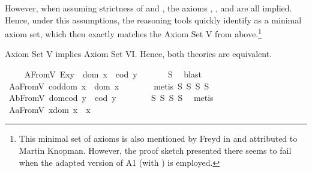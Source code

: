 \begin{isabellebody}
\begin{isamarkuptext}
   However, when assuming strictness of  and , the axioms , 
   ,  and  are all implied. Hence, under this 
   assumptions, the reasoning tools quickly identify  as a minimal axiom 
   set, which then exactly matches the Axiom Set V from above.\footnote{This minimal set of axioms 
   is also mentioned by Freyd in \cite{Freyd16} and attributed to Martin Knopman. However, the proof
   sketch presented there seems to fail when the adapted version of A1 (with \isa{{\isasymsimeq}}) is employed.}%
\end{isamarkuptext}\isamarkuptrue%
%
\begin{isamarkuptext}%
Axiom Set V implies Axiom Set VI. Hence, both theories are equivalent.%
\end{isamarkuptext}\isamarkuptrue%
\isanewline
\ \ \isamarkupfalse%
\ \ A{}FromV{\isacharcolon}\ {\isachardoublequoteopen}E{\isacharparenleft}x{\isasymcdot}y{\isacharparenright}\ \isactrlbold {\isasymleftrightarrow}\ dom\ x\ {\isasymsimeq}\ cod\ y{\isachardoublequoteclose}\ \isanewline
%
\isadelimproof
\ \ \ \ %
\endisadelimproof
%
\isatagproof
{}\isamarkupfalse%
\ S{}\ \isamarkupfalse%
\ blast%
\endisatagproof
{\isafoldproof}%
%
\isadelimproof
\isanewline
%
\endisadelimproof
\ \ \isamarkupfalse%
\ A{}aFromV{\isacharcolon}\ {\isachardoublequoteopen}cod{\isacharparenleft}dom\ x{\isacharparenright}\ {\isasymcong}\ dom\ x{\isachardoublequoteclose}\ \ \isanewline
%
\isadelimproof
\ \ \ \ %
\endisadelimproof
%
\isatagproof
{}\isamarkupfalse%
\ {\isacharparenleft}metis\ S{}\ S{}\ S{}\ S{}{\isacharparenright}%
\endisatagproof
{\isafoldproof}%
%
\isadelimproof
\isanewline
%
\endisadelimproof
\ \ \isamarkupfalse%
\ A{}bFromV{\isacharcolon}\ {\isachardoublequoteopen}dom{\isacharparenleft}cod\ y{\isacharparenright}\ {\isasymcong}\ cod\ y{\isachardoublequoteclose}\ \ \isanewline
%
\isadelimproof
\ \ \ \ %
\endisadelimproof
%
\isatagproof
{}\isamarkupfalse%
\ S{}\ S{}\ S{}\ S{}\ \isamarkupfalse%
\ metis%
\endisatagproof
{\isafoldproof}%
%
\isadelimproof
\isanewline
%
\endisadelimproof
\ \ \isamarkupfalse%
\ A{}aFromV{\isacharcolon}\ {\isachardoublequoteopen}x{\isasymcdot}{\isacharparenleft}dom\ x{\isacharparenright}\ {\isasymcong}\ x{\isachardoublequoteclose}\ \isanewline

\end{isabellebody}
